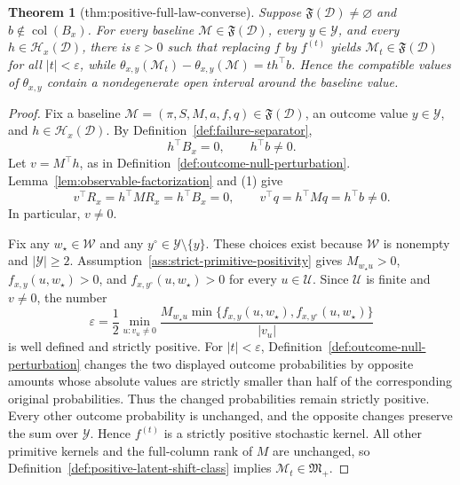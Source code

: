 \documentclass{article}
\newtheorem{theorem}{Theorem}
\begin{document}
\begin{theorem}[thm:positive-full-law-converse]\label{thm:positive-full-law-converse}
Suppose \(\mathfrak F(\mathcal D)\ne\varnothing\) and \(b\notin\operatorname{col}(B_x)\). For every baseline \(\mathcal M\in\mathfrak F(\mathcal D)\), every \(y\in\mathcal Y\), and every \(h\in\mathcal H_x(\mathcal D)\), there is \(\varepsilon>0\) such that replacing \(f\) by \(f^{(t)}\) yields \(\mathcal M_t\in\mathfrak F(\mathcal D)\) for all \(|t|<\varepsilon\), while \(\theta_{x,y}(\mathcal M_t)-\theta_{x,y}(\mathcal M)=t h^{\top}b\). Hence the compatible values of \(\theta_{x,y}\) contain a nondegenerate open interval around the baseline value.
\end{theorem}
\begin{proof}
Fix a baseline \(\mathcal M=(\pi,S,M,a,f,q)\in\mathfrak F(\mathcal D)\), an outcome value \(y\in\mathcal Y\), and \(h\in\mathcal H_x(\mathcal D)\). By Definition~\ref{def:failure-separator},
\[
h^{\top}B_x=0,
\qquad
h^{\top}b\ne0.
\tag{1}
\]
Let \(v=M^{\top}h\), as in Definition~\ref{def:outcome-null-perturbation}. Lemma~\ref{lem:observable-factorization} and (1) give
\[
v^{\top}R_x=h^{\top}MR_x=h^{\top}B_x=0,
\qquad
v^{\top}q=h^{\top}Mq=h^{\top}b\ne0.
\tag{2}
\]
In particular, \(v\ne0\).

Fix any \(w_{\star}\in\mathcal W\) and any \(y^{\circ}\in\mathcal Y\setminus\{y\}\). These choices exist because \(\mathcal W\) is nonempty and \(\lvert\mathcal Y\rvert\ge2\). Assumption~\ref{ass:strict-primitive-positivity} gives \(M_{w_{\star}u}>0\), \(f_{x,y}(u,w_{\star})>0\), and \(f_{x,y^{\circ}}(u,w_{\star})>0\) for every \(u\in\mathcal U\). Since \(\mathcal U\) is finite and \(v\ne0\), the number
\[
\varepsilon
=\frac12\min_{u:v_u\ne0}
\frac{M_{w_{\star}u}\min\{f_{x,y}(u,w_{\star}),
f_{x,y^{\circ}}(u,w_{\star})\}}{|v_u|}
\tag{3}
\]
is well defined and strictly positive. For \(|t|<\varepsilon\), Definition~\ref{def:outcome-null-perturbation} changes the two displayed outcome probabilities by opposite amounts whose absolute values are strictly smaller than half of the corresponding original probabilities. Thus the changed probabilities remain strictly positive. Every other outcome probability is unchanged, and the opposite changes preserve the sum over \(\mathcal Y\). Hence \(f^{(t)}\) is a strictly positive stochastic kernel. All other primitive kernels and the full-column rank of \(M\) are unchanged, so Definition~\ref{def:positive-latent-shift-class} implies \(\mathcal M_t\in\mathfrak M_{+}\).


\end{proof}
\end{document}
